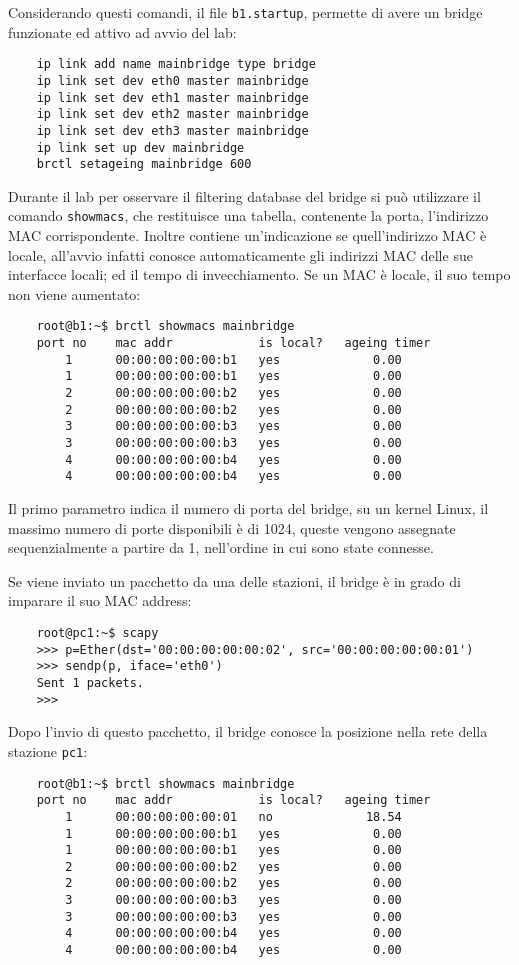 \documentclass{article}
\numberwithin{equation}{subsection}
\begin{document}
Considerando questi comandi, il file \verb|b1.startup|, permette di avere un bridge funzionate ed attivo ad avvio del lab:
\begin{verbatim}
    ip link add name mainbridge type bridge
    ip link set dev eth0 master mainbridge
    ip link set dev eth1 master mainbridge
    ip link set dev eth2 master mainbridge
    ip link set dev eth3 master mainbridge
    ip link set up dev mainbridge
    brctl setageing mainbridge 600
\end{verbatim}

Durante il lab per osservare il filtering database del bridge si può utilizzare il comando \verb|showmacs|, che restituisce una tabella, contenente la porta, 
l'indirizzo MAC corrispondente. Inoltre contiene un'indicazione se quell'indirizzo MAC è locale, all'avvio infatti conosce automaticamente gli indirizzi MAC delle sue 
interfacce locali; 
ed il tempo di invecchiamento. Se un MAC è locale, il suo tempo non viene aumentato:
\begin{verbatim}
    root@b1:~$ brctl showmacs mainbridge
    port no    mac addr            is local?   ageing timer
        1      00:00:00:00:00:b1   yes             0.00
        1      00:00:00:00:00:b1   yes             0.00
        2      00:00:00:00:00:b2   yes             0.00
        2      00:00:00:00:00:b2   yes             0.00
        3      00:00:00:00:00:b3   yes             0.00
        3      00:00:00:00:00:b3   yes             0.00
        4      00:00:00:00:00:b4   yes             0.00
        4      00:00:00:00:00:b4   yes             0.00
\end{verbatim}
Il primo parametro indica il numero di porta del bridge, su un kernel Linux, il massimo numero di porte disponibili è di 1024, queste vengono assegnate sequenzialmente 
a partire da 1, nell'ordine in cui sono state connesse. 

Se viene inviato un pacchetto da una delle stazioni, il bridge è in grado di imparare il suo MAC address:
\begin{verbatim}
    root@pc1:~$ scapy
    >>> p=Ether(dst='00:00:00:00:00:02', src='00:00:00:00:00:01')
    >>> sendp(p, iface='eth0')
    Sent 1 packets.
    >>>
\end{verbatim}

Dopo l'invio di questo pacchetto, il bridge conosce la posizione nella rete della stazione \verb|pc1|:
\begin{verbatim}
    root@b1:~$ brctl showmacs mainbridge
    port no    mac addr            is local?   ageing timer
        1      00:00:00:00:00:01   no             18.54
        1      00:00:00:00:00:b1   yes             0.00
        1      00:00:00:00:00:b1   yes             0.00
        2      00:00:00:00:00:b2   yes             0.00
        2      00:00:00:00:00:b2   yes             0.00
        3      00:00:00:00:00:b3   yes             0.00
        3      00:00:00:00:00:b3   yes             0.00
        4      00:00:00:00:00:b4   yes             0.00
        4      00:00:00:00:00:b4   yes             0.00
\end{verbatim}
\end{document}
